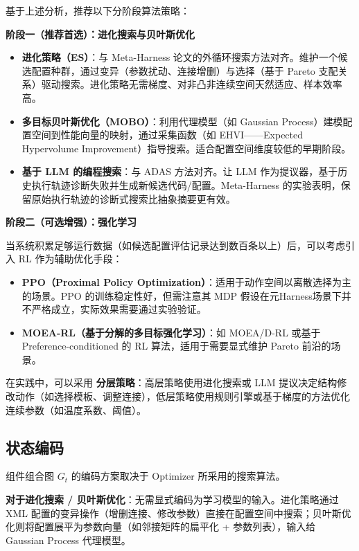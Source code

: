 基于上述分析，推荐以下分阶段算法策略：

\textbf{阶段一（推荐首选）：进化搜索与贝叶斯优化}

\begin{itemize}
    \item \textbf{进化策略（ES）}：与 Meta-Harness 论文的外循环搜索方法对齐。维护一个候选配置种群，通过变异（参数扰动、连接增删）与选择（基于 Pareto 支配关系）驱动搜索。进化策略无需梯度、对非凸非连续空间天然适应、样本效率高。
    \item \textbf{多目标贝叶斯优化（MOBO）}：利用代理模型（如 Gaussian Process）建模配置空间到性能向量的映射，通过采集函数（如 EHVI——Expected Hypervolume Improvement）指导搜索。适合配置空间维度较低的早期阶段。
    \item \textbf{基于 LLM 的编程搜索}：与 ADAS 方法对齐。让 LLM 作为提议器，基于历史执行轨迹诊断失败并生成新候选代码/配置。Meta-Harness 的实验表明，保留原始执行轨迹的诊断式搜索比抽象摘要更有效。
\end{itemize}

\textbf{阶段二（可选增强）：强化学习}

当系统积累足够运行数据（如候选配置评估记录达到数百条以上）后，可以考虑引入 RL 作为辅助优化手段：

\begin{itemize}
    \item \textbf{PPO（Proximal Policy Optimization）}：适用于动作空间以离散选择为主的场景。PPO 的训练稳定性好，但需注意其 MDP 假设在元Harness场景下并不严格成立，实际效果需要通过实验验证。
    \item \textbf{MOEA-RL（基于分解的多目标强化学习）}：如 MOEA/D-RL 或基于 Preference-conditioned 的 RL 算法，适用于需要显式维护 Pareto 前沿的场景。
\end{itemize}

在实践中，可以采用 \textbf{分层策略}：高层策略使用进化搜索或 LLM 提议决定结构修改动作（如选择模板、调整连接），低层策略使用规则引擎或基于梯度的方法优化连续参数（如温度系数、阈值）。

\subsection{状态编码}

组件组合图 $G_t$ 的编码方案取决于 Optimizer 所采用的搜索算法。

\textbf{对于进化搜索 / 贝叶斯优化}：无需显式编码为学习模型的输入。进化策略通过 XML 配置的变异操作（增删连接、修改参数）直接在配置空间中搜索；贝叶斯优化则将配置展平为参数向量（如邻接矩阵的扁平化 + 参数列表），输入给 Gaussian Process 代理模型。

